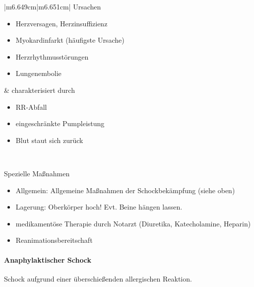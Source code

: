 \documentclass{article}
\begin{document}
\begin{center}
\tablehead{}\begin{supertabular}{|m{6.649cm}|m{6.651cm}|}
\hline
Ursachen

\begin{itemize}
\item Herzversagen, Herzinsuffizienz

\end{itemize}
\begin{itemize}
\item Myokardinfarkt (h\"aufigste Ursache)

\item Herzrhythmusst\"orungen

\end{itemize}
\begin{itemize}
\item Lungenembolie

\end{itemize}
 &
charakterisiert durch

\begin{itemize}
\item RR-Abfall

\item eingeschr\"ankte Pumpleistung

\end{itemize}
\begin{itemize}
\item Blut staut sich zur\"uck

\end{itemize}
\\\hline
\end{supertabular}
\end{center}
Spezielle Ma{\ss}nahmen

\begin{itemize}
\item Allgemein: Allgemeine Ma{\ss}nahmen der Schockbek\"ampfung (siehe
oben) 

\item Lagerung: Oberk\"orper hoch! Evt. Beine h\"angen  lassen. 

\item medikament\"ose Therapie durch Notarzt  (Diuretika, Katecholamine,
Heparin)

\item Reanimationsbereitschaft  

\end{itemize}
\paragraph{Anaphylaktischer Schock}
Schock aufgrund einer \"uberschie{\ss}enden allergischen Reaktion.
\end{document}
